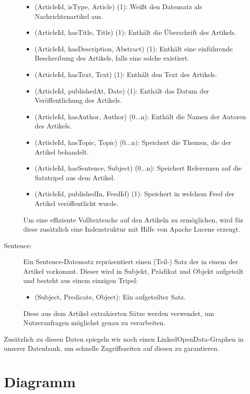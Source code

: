 \begin{description}
\begin{itemize}
  \item (ArticleId, isType, Article) (1): Weißt den Datensatz als Nachrichtenartikel aus.
  \item (ArticleId, hasTitle, Title) (1): Enthält die Überschrift des Artikels.
  \item (ArticleId, hasDescription, Abstract) (1): Enthält eine einführende Beschreibung des Artikels, falls eine solche existiert.
  \item (ArticleId, hasText, Text) (1): Enthält den Text des Artikels.
  \item (ArticleId, publishedAt, Date) (1): Enthält das Datum der Veröffentlichung des Artikels.
  \item (ArticleId, hasAuthor, Author) (0...n): Enthält die Namen der Autoren des Artikels.
  \item (ArticleId, hasTopic, Topic) (0...n): Speichert die Themen, die der Artikel behandelt.
  \item (ArticleId, hasSentence, Subject) (0...n): Speichert Referenzen auf die Satztripel aus dem Artikel.
  \item (ArticleId, publishedIn, FeedId) (1): Speichert in welchem Feed der Artikel veröffentlicht wurde.
\end{itemize}
Um eine effiziente Volltextsuche auf den Artikeln zu ermöglichen, wird für diese zusätzlich eine Indexstruktur mit Hilfe von Apache Lucene erzeugt.
\item[Sentence:] Ein Sentence-Datensatz repräsentiert einen (Teil-) Satz der in einem der Artikel vorkommt. Dieser wird in Subjekt, Prädikat und Objekt aufgeteilt und besteht aus einem einzigen Tripel:
\begin{itemize}
  \item (Subject, Predicate, Object): Ein aufgeteilter Satz.
\end{itemize}
Diese aus dem Artikel extrahierten Sätze werden verwendet, um Nutzeranfragen möglichst genau zu verarbeiten.
\end{description}

Zusätzlich zu diesen Daten spiegeln wir noch einen LinkedOpenData-Graphen in unserer Datenbank, um schnelle Zugriffszeiten auf diesen zu garantieren.

\pagebreak
\section{Diagramm} 

